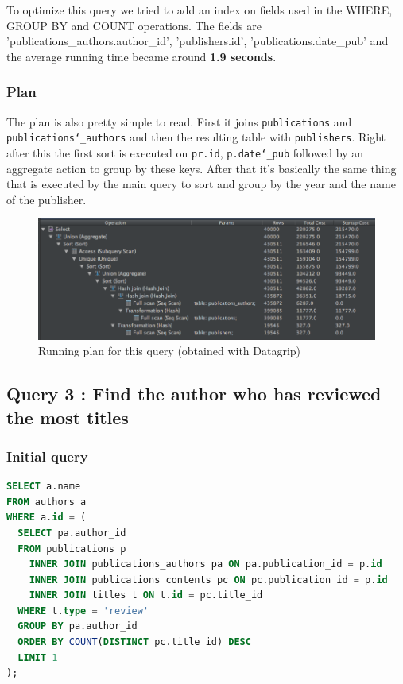\documentclass[doubleside, titlepage]{article}
\begin{document}
To optimize this query we tried to add an index on fields used in the WHERE, GROUP BY and COUNT operations. The fields are 'publications_authors.author_id', 'publishers.id', 'publications.date_pub' and the average running time became around \textbf{1.9 seconds}.

\subsubsection{Plan}
The plan is also pretty simple to read. First it joins \texttt{publications} and \texttt{publications\char`_authors} and then the resulting table with \texttt{publishers}. Right after this the first sort is executed on \texttt{pr.id}, \texttt{p.date\char`_pub} followed by an aggregate action to group by these keys. After that it's basically the same thing that is executed by the main query to sort and group by the year and the name of the publisher.

\begin{figure}[!htb]
	\centering
    \includegraphics[scale = 0.5]{./query_analysis/query16}
    \caption{Running plan for this query (obtained with Datagrip)}
\end{figure}

\newpage

\subsection{Query 3 : Find the author who has reviewed the most titles}

\subsubsection{Initial query}
		\begin{lstlisting}[language=SQL,showspaces=false,basicstyle=\ttfamily,numberstyle=\tiny,commentstyle=\color{gray}]
SELECT a.name
FROM authors a
WHERE a.id = (
  SELECT pa.author_id
  FROM publications p
    INNER JOIN publications_authors pa ON pa.publication_id = p.id
    INNER JOIN publications_contents pc ON pc.publication_id = p.id
    INNER JOIN titles t ON t.id = pc.title_id
  WHERE t.type = 'review'
  GROUP BY pa.author_id
  ORDER BY COUNT(DISTINCT pc.title_id) DESC
  LIMIT 1
);
		\end{lstlisting}
\end{document}
